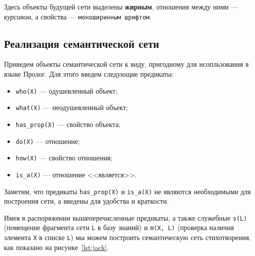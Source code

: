 Здесь объекты будущей сети выделены \textbf{жирным},
отношения между ними --- \textit{курсивом},
а свойства --- \texttt{моноширинным шрифтом}.


\subsection{Реализация семантической сети}

Приведем объекты семантической сети к виду,
пригодному для исопльзования в языке Пролог.
Для этого введем следующие предикаты:

\begin{itemize}
\item \texttt{who(X)} --- одушевленный объект;
\item \texttt{what(X)} --- неодушевленный объект;
\item \texttt{has\_prop(X)} --- свойство объекта;
\item \texttt{do(X)} --- отношение;
\item \texttt{how(X)} --- свойство отношения;
\item \texttt{is\_a(X)} --- отношение <<является>>.
\end{itemize}

Заметим, что предикаты \texttt{has\_prop(X)} и \texttt{is\_a(X)}
не являются необходимыми для построения сети,
а введены для удобства и краткости.

Имея в распоряжении вышеперечисленные предикаты,
а также служебные
\texttt{s(L)} (помещение фрагмента сети \texttt{L} в базу знаний) и
\texttt{m(X, L)} (проверка наличия элемента \texttt{X} в списке \texttt{L})
мы можем построить семантическую сеть стихотворения,
как показано на рисунке~\ref{lst:jack}.

\pagebreak



\pagebreak


